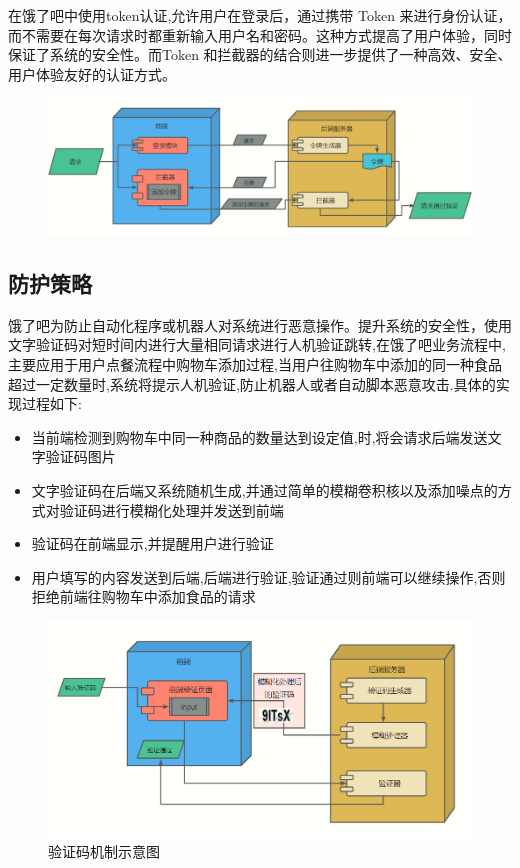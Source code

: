 在饿了吧中使用token认证,允许用户在登录后，通过携带 Token 来进行身份认证，而不需要在每次请求时都重新输入用户名和密码。这种方式提高了用户体验，同时保证了系统的安全性。而Token 和拦截器的结合则进一步提供了一种高效、安全、用户体验友好的认证方式。
\begin{figure}[H]
    \centering
    \includegraphics[width=1\linewidth]{pics/token认证.png}
\end{figure}
\subsection{防护策略}\label{con:rjyz}
饿了吧为防止自动化程序或机器人对系统进行恶意操作。提升系统的安全性，使用文字验证码对短时间内进行大量相同请求进行人机验证跳转,在饿了吧业务流程中,主要应用于用户点餐流程中购物车添加过程,当用户往购物车中添加的同一种食品超过一定数量时,系统将提示人机验证,防止机器人或者自动脚本恶意攻击.具体的实现过程如下:

\begin{itemize}
    \item 当前端检测到购物车中同一种商品的数量达到设定值,时,将会请求后端发送文字验证码图片
    \item 文字验证码在后端又系统随机生成,并通过简单的模糊卷积核以及添加噪点的方式对验证码进行模糊化处理并发送到前端
    \item 验证码在前端显示,并提醒用户进行验证
    \item 用户填写的内容发送到后端,后端进行验证,验证通过则前端可以继续操作,否则拒绝前端往购物车中添加食品的请求
\end{itemize}
\begin{figure}[h]
    \centering
    \includegraphics[width=1\linewidth]{pics/人机验证.png}
    \caption{验证码机制示意图}
\end{figure}


